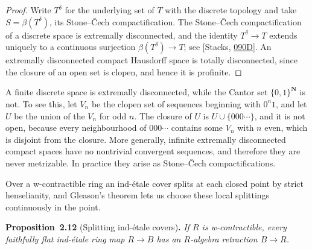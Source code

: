 \documentclass[11pt]{article}
\newenvironment{bpstatement}[2]{\par\addvspace{0.6\baselineskip}\noindent\textbf{#1}#2\textbf{.}\enspace\ignorespaces}
  {\par\addvspace{0.4\baselineskip}}
\newenvironment{bpstatementit}[2]{\begin{bpstatement}{#1}{#2}\itshape\ignorespaces}{\end{bpstatement}}
\begin{document}
\begin{proof}[{Proof}]\label{bp34}%
Write \(T^{\delta}\) for the underlying set of \(T\) with the discrete topology and take \(S=\beta(T^{\delta})\), its Stone–Čech compactification. The Stone–Čech compactification of a discrete space is extremally disconnected, and the identity \(T^{\delta}\to T\) extends uniquely to a continuous surjection \(\beta(T^{\delta})\to T\); see [Stacks, \href{https://stacks.math.columbia.edu/tag/090D}{090D}]. An extremally disconnected compact Hausdorff space is totally disconnected, since the closure of an open set is clopen, and hence it is profinite.
\end{proof}

\label{bp35}%
A finite discrete space is extremally disconnected, while the Cantor set \(\{0,1\}^{\mathbf N}\) is not. To see this, let \(V_n\) be the clopen set of sequences beginning with \(0^n1\), and let \(U\) be the union of the \(V_n\) for odd \(n\). The closure of \(U\) is \(U\cup\{000\cdots\}\), and it is not open, because every neighbourhood of \(000\cdots\) contains some \(V_n\) with \(n\) even, which is disjoint from the closure. More generally, infinite extremally disconnected compact spaces have no nontrivial convergent sequences, and therefore they are never metrizable. In practice they arise as Stone–Čech compactifications.

Over a w-contractible ring an ind-étale cover splits at each closed point by strict henselianity, and Gleason's theorem lets us choose these local splittings continuously in the point.

\label{bp36}%
\begin{bpstatementit}{Proposition~2.12}{ (Splitting ind-étale covers)}
If \(R\) is w-contractible, every faithfully flat ind-étale ring map \(R\to B\) has an \(R\)-algebra retraction \(B\to R\).
\end{bpstatementit}
\end{document}
